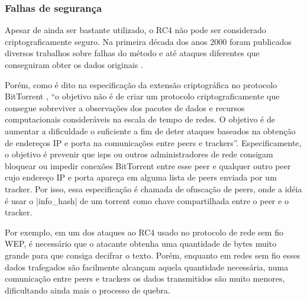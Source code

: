 
\subsubsection*{Falhas de segurança}

Apesar de ainda ser bastante utilizado, o RC4 não pode ser considerado
criptograficamente seguro. Na primeira década dos anos 2000 foram publicados diversos
trabalhos sobre falhas do método e até ataques diferentes que conseguiram obter os
dados originais
\cite{blog:matthew-rc4-1,blog:matthew-rc4-2,blog:matthew-rc4-3,artigo:patterson}.

Porém, como é dito na especificação da extensão criptográfica no protocolo BitTorrent
\cite{site:bittorrent-cripto}, ``o objetivo não é de criar um protocolo
criptograficamente que consegue sobreviver a observações dos pacotes de dados e recursos
computacionais consideráveis na escala de tempo de redes. O objetivo é de aumentar a
dificuldade o suficiente a fim de deter ataques baseados na obtenção de endereços IP e
porta na comunicações entre \glspl*{peer} e \glspl*{tracker}''. Especificamente, o
objetivo é prevenir que \glspl{isp} ou outros administradores de rede consigam bloquear
ou impedir conexões BitTorrent entre esse \gls*{peer} e qualquer outro \gls*{peer} cujo
endereço IP e porta apareça em alguma lista de \glspl*{peer} enviada por um
\gls*{tracker}. Por isso, essa especificação é chamada de ofuscação de \glspl*{peer},
onde a idéia é usar o \bverb|info_hash| de um \gls*{torrent} como chave compartilhada
entre o \gls*{peer} e o \gls*{tracker}.

Por exemplo, em um dos ataques ao RC4 usado no protocolo de rede sem fio WEP, é
necessário que o atacante obtenha uma quantidade de bytes muito grande para que consiga
decifrar o texto. Porém, enquanto em redes sem fio esses dados trafegados são facilmente
alcançam aquela quantidade necessária, numa comunicação entre \glspl*{peer} e
\glspl*{tracker} os dados transmitidos são muito menores, dificultando ainda mais o
processo de quebra.